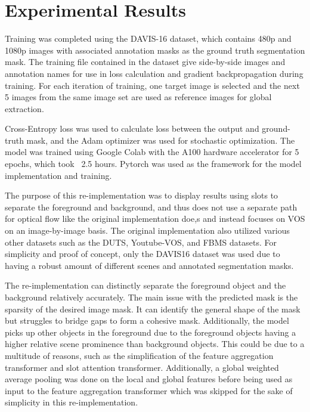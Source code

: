 \documentclass{article}
\theoremstyle{plain}
\theoremstyle{definition}
\theoremstyle{remark}
\begin{document}
\section*{Experimental Results}

\hspace{20pt} Training was completed using the DAVIS-16 dataset, which contains 480p and 1080p images with associated annotation masks as the ground truth segmentation mask. The training file contained in the dataset give side-by-side images and annotation names for use in loss calculation and gradient backpropagation during training. For each iteration of training, one target image is selected and the next 5 images from the same image set are used as reference images for global extraction.

\hspace{20pt} Cross-Entropy loss was used to calculate loss between the output and ground-truth mask, and the Adam optimizer was used for stochastic optimization. The model was trained using Google Colab with the A100 hardware accelerator for 5 epochs, which took ~2.5 hours. Pytorch was used as the framework for the model implementation and training. 

\hspace{20pt} The purpose of this re-implementation was to display results using slots to separate the foreground and background, and thus does not use a separate path for optical flow like the original implementation doe,s and instead focuses on VOS on an image-by-image basis. The original implementation also utilized various other datasets such as the DUTS, Youtube-VOS, and FBMS datasets. For simplicity and proof of concept, only the DAVIS16 dataset was used due to having a robust amount of different scenes and annotated segmentation masks.

\hspace{20pt} The re-implementation can distinctly separate the foreground object and the background relatively accurately. The main issue with the predicted mask is the sparsity of the desired image mask. It can identify the general shape of the mask but struggles to bridge gaps to form a cohesive mask. Additionally, the model picks up other objects in the foreground due to the foreground objects having a higher relative scene prominence than background objects. This could be due to a multitude of reasons, such as the simplification of the feature aggregation transformer and slot attention transformer. Additionally, a global weighted average pooling was done on the local and global features before being used as input to the feature aggregation transformer which was skipped for the sake of simplicity in this re-implementation.
\end{document}

